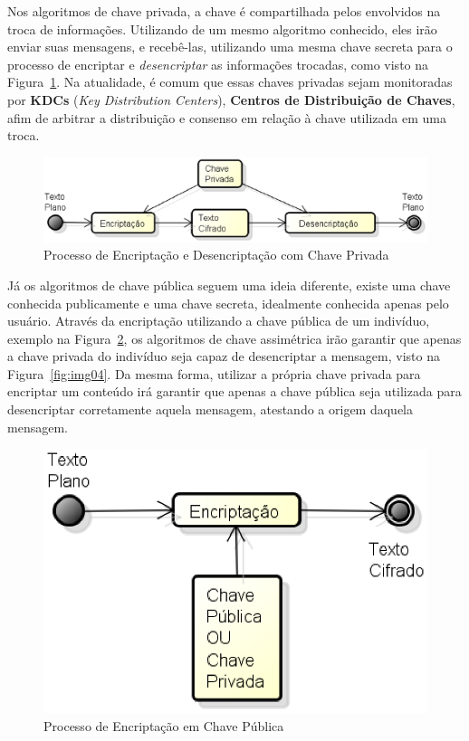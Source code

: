 	Nos algoritmos de chave privada, a chave é compartilhada pelos envolvidos na troca de informações. Utilizando de um mesmo algoritmo conhecido, eles irão enviar suas mensagens, e recebê-las, utilizando uma mesma chave secreta para o processo de encriptar e \textit{desencriptar} as informações trocadas, como visto na Figura~\ref{fig:img02}. Na atualidade, é comum que essas chaves privadas sejam monitoradas por \textbf{KDCs} (\textit{Key Distribution Centers}), \textbf{Centros de Distribuição de Chaves}, afim de arbitrar a distribuição e consenso em relação à chave utilizada em uma troca.

	\begin{figure}[h]
		\centering
		\includegraphics[keepaspectratio=true,scale=0.5]{figuras/img01.eps}
		\caption{Processo de Encriptação e Desencriptação com Chave Privada}
		\label{fig:img02}
	\end{figure}

	Já os algoritmos de chave pública seguem uma ideia diferente, existe uma chave conhecida publicamente e uma chave secreta, idealmente conhecida apenas pelo usuário. Através da encriptação utilizando a chave pública de um indivíduo, exemplo na Figura~\ref{fig:img03}, os algoritmos de chave assimétrica irão garantir que apenas a chave privada do indivíduo seja capaz de desencriptar a mensagem, visto na Figura~\ref{fig:img04}. Da mesma forma, utilizar a própria chave privada para encriptar um conteúdo irá garantir que apenas a chave pública seja utilizada para desencriptar corretamente aquela mensagem, atestando a origem daquela mensagem.

	\begin{figure}[!ht]
		\centering
		\includegraphics[keepaspectratio=true,scale=0.5]{figuras/encript.eps}
		\caption{Processo de Encriptação em Chave Pública}
		\label{fig:img03}
	\end{figure}
	
